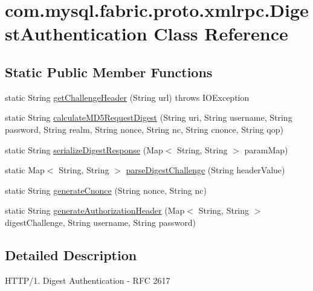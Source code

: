 \hypertarget{classcom_1_1mysql_1_1fabric_1_1proto_1_1xmlrpc_1_1_digest_authentication}{}\section{com.\+mysql.\+fabric.\+proto.\+xmlrpc.\+Digest\+Authentication Class Reference}
\label{classcom_1_1mysql_1_1fabric_1_1proto_1_1xmlrpc_1_1_digest_authentication}
\subsection*{Static Public Member Functions}
\begin{DoxyCompactItemize}
\item 
static String \mbox{\hyperlink{classcom_1_1mysql_1_1fabric_1_1proto_1_1xmlrpc_1_1_digest_authentication_ad9ce3cfbee13158823b154c4becee425}{get\+Challenge\+Header}} (String url)  throws I\+O\+Exception 
\item 
static String \mbox{\hyperlink{classcom_1_1mysql_1_1fabric_1_1proto_1_1xmlrpc_1_1_digest_authentication_a4fdd078d57ecac0859549c94bb2c1e8a}{calculate\+M\+D5\+Request\+Digest}} (String uri, String username, String password, String realm, String nonce, String nc, String cnonce, String qop)
\item 
static String \mbox{\hyperlink{classcom_1_1mysql_1_1fabric_1_1proto_1_1xmlrpc_1_1_digest_authentication_a49b053a5230a3da6f09e04dc411b43a9}{serialize\+Digest\+Response}} (Map$<$ String, String $>$ param\+Map)
\item 
static Map$<$ String, String $>$ \mbox{\hyperlink{classcom_1_1mysql_1_1fabric_1_1proto_1_1xmlrpc_1_1_digest_authentication_a683328b672137be86be1fe63ae788c0f}{parse\+Digest\+Challenge}} (String header\+Value)
\item 
static String \mbox{\hyperlink{classcom_1_1mysql_1_1fabric_1_1proto_1_1xmlrpc_1_1_digest_authentication_ad06c98ef189413a4f866dacbcdf12137}{generate\+Cnonce}} (String nonce, String nc)
\item 
static String \mbox{\hyperlink{classcom_1_1mysql_1_1fabric_1_1proto_1_1xmlrpc_1_1_digest_authentication_a7383e84a342b4945b22e8f3cca0b526d}{generate\+Authorization\+Header}} (Map$<$ String, String $>$ digest\+Challenge, String username, String password)
\end{DoxyCompactItemize}


\subsection{Detailed Description}
H\+T\+T\+P/1. Digest Authentication -\/ R\+FC 2617 

